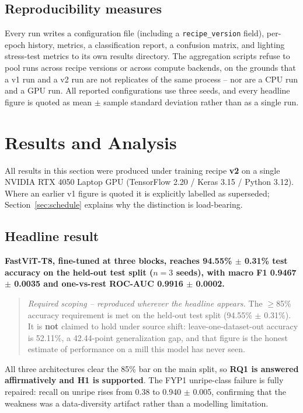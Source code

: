 \documentclass{article}
\begin{document}
\subsection{Reproducibility measures}

Every run writes a configuration file (including a \texttt{recipe\_version} field), per-epoch history,
metrics, a classification report, a confusion matrix, and lighting stress-test metrics to its own results
directory. The aggregation scripts refuse to pool runs across recipe versions or across compute backends,
on the grounds that a v1 run and a v2 run are not replicates of the same process -- nor are a CPU run and
a GPU run. All reported configurations use three seeds, and every headline figure is quoted as mean $\pm$
sample standard deviation rather than as a single run.

\section{Results and Analysis}
\label{sec:results}

All results in this section were produced under training recipe \textbf{v2} on a single NVIDIA RTX 4050
Laptop GPU (TensorFlow 2.20 / Keras 3.15 / Python 3.12). Where an earlier v1 figure is quoted it is
explicitly labelled as superseded; Section~\ref{sec:schedule} explains why the distinction is
load-bearing.

\subsection{Headline result}

\textbf{FastViT-T8, fine-tuned at three blocks, reaches 94.55\% $\pm$ 0.31\% test accuracy on the held-out
test split ($n{=}3$ seeds), with macro F1 0.9467 $\pm$ 0.0035 and one-vs-rest ROC-AUC 0.9916 $\pm$
0.0002.}

\begin{quote}
\textit{Required scoping -- reproduced wherever the headline appears.} The $\geq$85\% accuracy requirement
is met on the held-out test split (94.55\% $\pm$ 0.31\%). It is \textbf{not} claimed to hold under source
shift: leave-one-dataset-out accuracy is 52.11\%, a 42.44-point generalization gap, and that figure is the
honest estimate of performance on a mill this model has never seen.
\end{quote}

All three architectures clear the 85\% bar on the main split, so \textbf{RQ1 is answered affirmatively and
H1 is supported}. The FYP1 unripe-class failure is fully repaired: recall on unripe rises from 0.38 to
0.940 $\pm$ 0.005, confirming that the weakness was a data-diversity artifact rather than a modelling
limitation.
\end{document}
